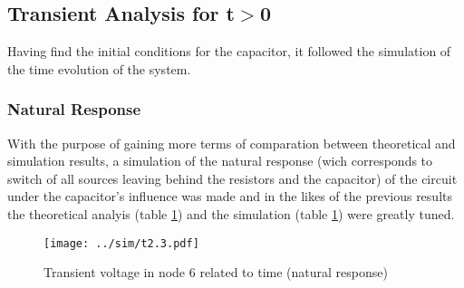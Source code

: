 \begin{table}[h]
  \centering
 \caption{Simulation results. A variable preceded by @ is of type {\em current}
   and expressed in Ampere; other variables are of type {\it voltage} and expressed in
   Volt.}
  \label{tab:op2}
\end{table}






\subsection{Transient Analysis for t$>$0}

Having find the initial conditions for the capacitor, it followed the simulation of the time evolution of the system.

\subsubsection{Natural Response}

With the purpose of gaining more terms of comparation between theoretical and simulation results, a simulation of the natural response (wich corresponds to switch of all sources leaving behind the resistors and the capacitor) of the circuit under the capacitor's influence was made and in the likes of the previous results the theoretical analyis (table \ref{fig:trans1}) and the simulation (table \ref{fig:trans1}) were greatly tuned.

\begin{figure}[h] \centering
\texttt{[image: ../sim/t2.3.pdf]}
\caption{Transient voltage in node 6 related to time (natural response)}
\label{fig:trans1}
\end{figure}

